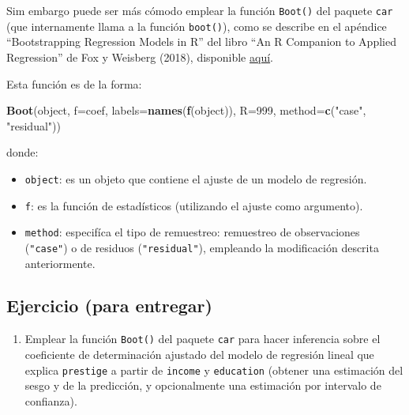 \documentclass[
]{book}
\newenvironment{Shaded}{\begin{snugshade}}{\end{snugshade}}
\newcommand{\DataTypeTok}[1]{\textcolor[rgb]{0.13,0.29,0.53}{#1}}
\newcommand{\DecValTok}[1]{\textcolor[rgb]{0.00,0.00,0.81}{#1}}
\newcommand{\KeywordTok}[1]{\textcolor[rgb]{0.13,0.29,0.53}{\textbf{#1}}}
\newcommand{\NormalTok}[1]{#1}
\newcommand{\StringTok}[1]{\textcolor[rgb]{0.31,0.60,0.02}{#1}}
\providecommand{\tightlist}{%
  \setlength{\itemsep}{0pt}\setlength{\parskip}{0pt}}
\theoremstyle{definition}
\theoremstyle{definition}
\theoremstyle{definition}
\theoremstyle{remark}
\begin{document}
Sim embargo puede ser más cómodo emplear la función \texttt{Boot()} del paquete \texttt{car}
(que internamente llama a la función \texttt{boot()}),
como se describe en el apéndice ``Bootstrapping Regression Models in R'' del libro
``An R Companion to Applied Regression'' de Fox y Weisberg (2018), disponible
\href{https://socialsciences.mcmaster.ca/jfox/Books/Companion/appendices/Appendix-Bootstrapping.pdf}{aquí}.

Esta función es de la forma:

\begin{Shaded}
\begin{Highlighting}[]
\KeywordTok{Boot}\NormalTok{(object, }\DataTypeTok{f=}\NormalTok{coef, }\DataTypeTok{labels=}\KeywordTok{names}\NormalTok{(}\KeywordTok{f}\NormalTok{(object)), }\DataTypeTok{R=}\DecValTok{999}\NormalTok{, }\DataTypeTok{method=}\KeywordTok{c}\NormalTok{(}\StringTok{"case"}\NormalTok{, }\StringTok{"residual"}\NormalTok{))}
\end{Highlighting}
\end{Shaded}

donde:

\begin{itemize}
\item
  \texttt{object}: es un objeto que contiene el ajuste de un modelo de regresión.
\item
  \texttt{f}: es la función de estadísticos (utilizando el ajuste como argumento).
\item
  \texttt{method}: especifíca el tipo de remuestreo: remuestreo de observaciones (\texttt{"case"})
  o de residuos (\texttt{"residual"}), empleando la modificación descrita anteriormente.
\end{itemize}

\hypertarget{ejercicio-para-entregar-1}{%
\subsection{Ejercicio (para entregar)}\label{ejercicio-para-entregar-1}}

\begin{enumerate}
\def\labelenumi{\arabic{enumi}.}
\setcounter{enumi}{1}
\tightlist
\item
  Emplear la función \texttt{Boot()} del paquete \texttt{car} para hacer inferencia sobre
  el coeficiente de determinación ajustado del modelo de regresión lineal
  que explica \texttt{prestige} a partir de \texttt{income} y \texttt{education}
  (obtener una estimación del sesgo y de la predicción,
  y opcionalmente una estimación por intervalo de confianza).
\end{enumerate}
\end{document}
